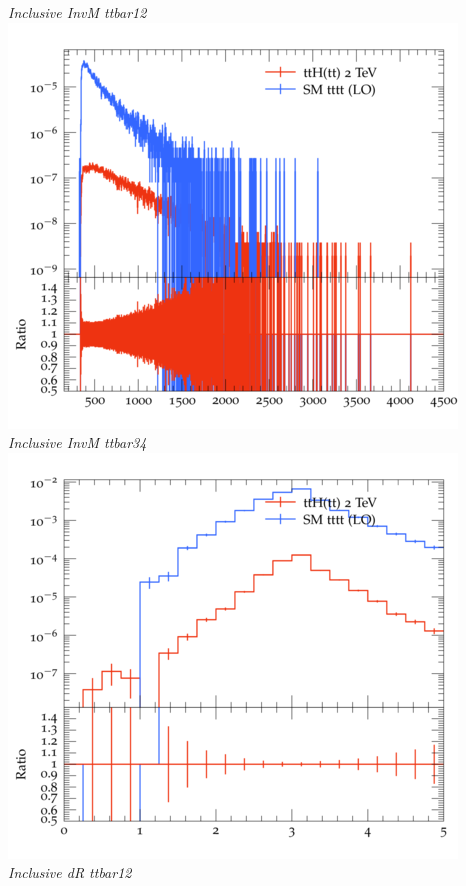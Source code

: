 \documentclass{beamer}
\begin{document}
\begin{frame}
\begin{columns}
\textit{\small Inclusive InvM ttbar12}
\includegraphics[width=\textwidth]{../plots/ttH_2000/tttt_ttH/Inclusive_InvM_ttbar34.png}\\
\textit{\small Inclusive InvM ttbar34}
\includegraphics[width=\textwidth]{../plots/ttH_2000/tttt_ttH/Inclusive_dR_ttbar12.png}\\
\textit{\small Inclusive dR ttbar12}
\end{columns}
\end{frame}
\end{document}
